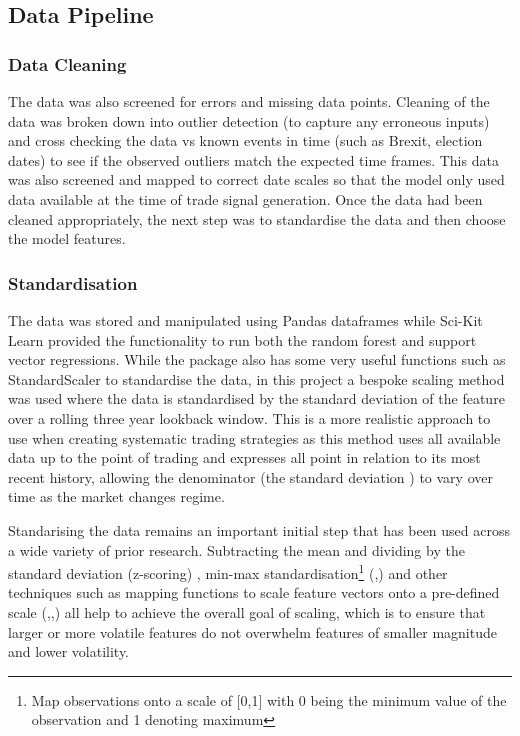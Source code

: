 \documentclass[11pt]{article}
\begin{document}
\subsection{Data Pipeline}

\subsubsection{Data Cleaning}
The data was also screened for errors and missing data points. Cleaning of the data was broken down into outlier detection (to capture any erroneous inputs) and cross checking the data vs known events in time (such as Brexit, election dates) to see if the observed outliers match the expected time frames. This data was also screened and mapped to correct date scales so that the model only used data available at the time of trade signal generation. Once the data had been cleaned appropriately, the next step was to standardise the data and then choose the model features.

\subsubsection{Standardisation}
 The data was stored and manipulated using Pandas dataframes while Sci-Kit Learn provided the functionality to run both the random forest and support vector regressions. While the package also has some very useful functions such as StandardScaler to standardise the data, in this project a bespoke scaling method was used where the data is standardised by the standard deviation of the feature over a rolling three year lookback window. This is a more realistic approach to use when creating systematic trading strategies as this method uses all available data up to the point of trading and expresses all point in relation to its most recent history, allowing the denominator (the standard deviation ) to vary over time as the market changes regime.
\par Standarising the data remains an important initial step that has been used across a wide variety of prior research. Subtracting the mean and dividing by the standard deviation (z-scoring) \cite{Fischer2018}, min-max standardisation\footnote{Map observations onto a scale of [0,1] with 0 being the minimum value of the observation and 1 denoting maximum} (\cite{Gunduz2017},\cite{Kumar2006})  and other techniques such as  mapping functions to scale feature vectors onto a pre-defined scale (\cite{Kara2011},\cite{Wang2014},\cite{Patel2015}) all help to achieve the overall goal of scaling, which is to ensure that larger or more volatile features do not overwhelm features of smaller magnitude and lower volatility.  
\end{document}
